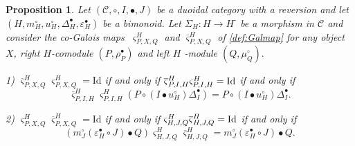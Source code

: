 \documentclass[nosumlimits,twoside]{amsart}
\newtheorem{proposition}[proposition]{\sc Proposition}
\theoremstyle{definition}
\theoremstyle{remark}
\newcommand{\rd}[1]{{\color{red}{#1}}}
\newcommand{\Cc}{\mathcal{C}}
\begin{document}
\begin{proposition}%
\label{prop:cogal1} Let $\left( \mathcal{C},\circ ,I,\bullet ,J\right) $ be
a duoidal category with a reversion and let $\left( H,m_{H}^{\circ
},u_{H}^{\circ },\Delta _{H}^{\bullet },\varepsilon _{H}^{\bullet }\right) $
be a bimonoid. Let $\Sigma _{H}:H\rightarrow H^{\text{-} }$ be a morphism in $\Cc$
and consider the co-Galois maps\textbf{\ }$\varsigma _{P,X,Q}^{H}$ and $%
\overline{\varsigma}_{P,X,Q}^{H}$ of \cref{def:Galmap} for any object $X$,
right $H$-comodule $\left( P,\rho _{P}^{\bullet }\right) $ and left $H$%
-module $\left( Q,\mu _{Q}^{\circ }\right) .$

1) $\overline{\varsigma }_{P,X,Q}^{H}\varsigma _{P,X,Q}^{H}=\mathrm{Id}$ if
and only if $\overline{\varsigma }_{P,I,H}^{H}\varsigma _{P,I,H}^{H}=\mathrm{%
Id}$ if and only if
\begin{equation}
\overline{\varsigma }_{P,I,H}^{H}\varsigma _{P,I,H}^{H}\left( P\circ \left(
I\bullet u_{H}^{\circ }\right) \Delta _{I}^{\bullet }\right) = P\circ \left( I\bullet u_{H}^{\circ
}\right) \Delta _{I}^{\bullet }.
\label{eq:coGalinvGal}
\end{equation}

2) $\varsigma _{P,X,Q}^{H}\overline{\varsigma }_{P,X,Q}^{H}=\mathrm{Id}$ if
and only if $\varsigma _{H,J,Q}^{H}\overline{\varsigma }_{H,J,Q}^{H}=\mathrm{%
Id}$ if and only if%
\begin{equation}
\left( m_{J}^{\circ }\left( \varepsilon _{H}^{\bullet }\circ
J\right) \bullet Q\right) \varsigma _{H,J,Q}^{H}\overline{\varsigma }%
_{H,J,Q}^{H}= m_{J}^{\circ }\left( \varepsilon
_{H}^{\bullet }\circ J\right) \bullet Q.  \label{eq:coGalGalinv}
\end{equation}
\end{proposition}
\end{document}
